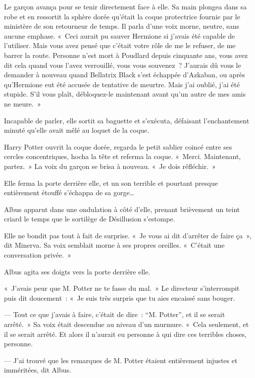 Le garçon avança pour se tenir directement face à elle.
Sa main plongea dans sa robe et en ressortit la sphère dorée qu'était la coque protectrice fournie par le ministère de son retourneur de temps.
Il parla d'une voix morne, neutre, sans aucune emphase.
«~Ceci aurait pu sauver Hermione si j'avais été capable de l'utiliser.
Mais vous avez pensé que c'était votre rôle de me le refuser, de me barrer la route.
Personne n'est mort à Poudlard depuis cinquante ans, vous avez dit cela quand vous l'avez verrouillé, vous vous souvenez~?
J'aurais dû vous le demander à nouveau quand Bellatrix Black s'est échappée d'Azkaban, ou après qu'Hermione eut été accusée de tentative de meurtre.
Mais j'ai oublié, j'ai été stupide.
S'il vous plaît, débloquez-le maintenant avant qu'un autre de mes amis ne meure.~»

Incapable de parler, elle sortit sa baguette et s'exécuta, défaisant l'enchantement minuté qu'elle avait mêlé au loquet de la coque.

Harry Potter ouvrit la coque dorée, regarda le petit sablier coincé entre ses cercles concentriques, hocha la tête et referma la coque.
«~Merci.
Maintenant, partez.~»
La voix du garçon se brisa à nouveau.
«~Je dois réfléchir.~»

\later

Elle ferma la porte derrière elle, et un son terrible et pourtant presque entièrement étouffé s'échappa de sa gorge…

Albus apparut dans une ondulation à côté d'elle, prenant brièvement un teint criard le temps que le sortilège de Désillusion s'estompe.

Elle ne bondit pas tout à fait de surprise.
«~Je vous ai dit d'arrêter de faire ça~», dit Minerva.
Sa voix semblait morne à ses propres oreilles.
«~C'était une conversation privée.~»

Albus agita ses doigts vers la porte derrière elle.

«~J'avais peur que M. Potter ne te fasse du mal.~»
Le directeur s'interrompit puis dit doucement~: «~Je suis très surpris que tu aies encaissé sans bouger.

--- Tout ce que j'avais à faire, c'était de dire~: “M. Potter”, et il se serait arrêté.~»
Sa voix était descendue au niveau d'un murmure.
«~Cela seulement, et il se serait arrêté.
Et alors il n'aurait eu personne à qui dire ces terribles choses, personne.

--- J'ai trouvé que les remarques de M. Potter étaient entièrement injustes et imméritées, dit Albus.

